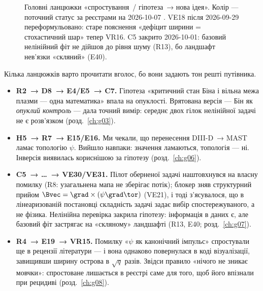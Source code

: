 \begin{figure}[ht]
\caption{Головні ланцюжки «спростування~/ гіпотеза~→ нова ідея». Колір --- поточний статус
за реєстрами на 2026-10-07 \cite{RegEst,RegConj,RegDec,RegViz}. VE18 після 2026-09-29
переформульовано: старе пояснення «дефіцит ширини = стохастичний шар» тепер VR16.
C5 закрито 2026-10-01: базовий нелінійний фіт не дійшов до рівня шуму (R13), бо ландшафт
нев'язки «скляний» (E40).}
\label{fig:g00-chains}
\end{figure}

Кілька ланцюжків варто прочитати вголос, бо вони задають тон решті путівника.
\begin{itemize}
\item \textbf{R2~→ D8~→ E4/E5~→ C7.} Гіпотеза «критичний стан Біна і вільна межа плазми ---
  одна математика» впала на опуклості. Врятована версія --- Бін як \emph{опуклий
  контроль} --- дала точний вимір: середнє двох гілок нелінійної задачі не є розв'язком
  (розд.~\ref{ch:g03}).
\item \textbf{H5~→ R7~→ E15/E16.} Ми чекали, що перенесення DIII-D~→ MAST ламає
  топологію $\psi$. Вийшло навпаки: значення ламаються, топологія --- ні. Інверсія виявилась
  кориснішою за гіпотезу (розд.~\ref{ch:g06}).
\item \textbf{C5~→ \ldots~→ VE30/VE31.} Пілот оберненої задачі наштовхнувся на власну
  помилку (R8: узагальнена мапа не зберігає потік); блокер зняв структурний прийом
  $\Bvec=\grad\times(\psi\grad\tor)$ (VE21), і тоді з'ясувалося, що в лінеаризованій постановці
  складність задачі задає вибір спостережуваного, а не фізика. Нелінійна перевірка закрила
  гіпотезу: інформація в даних є, але базовий фіт застрягає на «скляному» ландшафті (R13, E40;
  розд.~\ref{ch:g07}).
\item \textbf{R4~→ E19~→ VR15.} Помилку «$\psi$ як канонічний імпульс» спростували ще в
  рецензії літератури --- і вона однаково повернулася в коді візуалізації, завищивши ширину
  острова в $\sqrt q$ разів. Звідси правило «нічого не зникає мовчки»: спростоване
  лишається в реєстрі саме для того, щоб його впізнали при рецидиві (розд.~\ref{ch:g08}).
\end{itemize}

